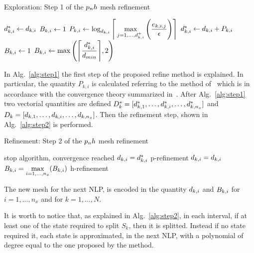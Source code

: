 


\begin{algorithm}
\caption{Exploration: Step 1 of the $p_{n}h$ mesh refinement}\label{alg:step1}
	\begin{algorithmic}[1]
				\State $d_{k,i}^{*} \gets d_{k,i}$
				\State $B_{k,i} \gets 1$  %
			\Else
				\State $P_{k,i} \gets \log_{d_{k,i}} \Bigg\lceil \max\limits_{j= 1, \dots, d_{k,i}^{+}} \Bigg(\dfrac{e_{k,i,j}}{\epsilon}\Bigg) \Bigg\rceil$
				\State $d_{k,i}^{*} \gets d_{k,i} + P_{k,i}$
						\State $B_{k,i} \gets 1$		
					\Else
						\State $B_{k,i} \gets \max\Bigg(\Bigg\lceil \dfrac{d_{k,i}^{*}}{d_{min}}\Bigg\rceil, 2\Bigg)$
					\EndIf
			\EndIf
		\EndFor
	\end{algorithmic}
\end{algorithm}

In Alg.~\ref{alg:step1} the first step of the proposed refine method is explained. In particular, the quantity $P_{k,i}$ is calculated referring to the method of~\cite{Patterson:OCAM:2015} which is in accordance with the convergence theory summarized in~\cite{Hou:GNC:2012,Hou:PHD:2013}.  After Alg.~\ref{alg:step1} two vectorial quantities are defined $D_{k}^{*} = [d_{k,1}^{*}, \dots, d_{k,i}^{*}, \dots, d_{k,n_x}^{*}]$ and $D_{k} = [d_{k,1}, \dots, d_{k,i}, \dots, d_{k,n_x}]$. Then the refinement step, shown in Alg.~\ref{alg:step2} is performed.

\begin{algorithm}
	\caption{Refinement: Step 2 of the $p_{n}h$ mesh refinement}\label{alg:step2}
	\begin{algorithmic}[1]
			\If {$\Dks = \Dk$}
				\State stop algorithm, convergence reached	
			\Else
					\State $d_{k,i} = d_{k,i}^{*}$ \Comment p-refinement
				\EndFor
			\EndIf
		\Else
				\State $d_{k,i} = d_{k,i}$
				\State $B_{k,i} = \max\limits_{i= 1, \dots, n_x}(B_{k,i})$ \Comment h-refinement
			\EndFor		
		\EndIf
	\end{algorithmic}
\end{algorithm}


The new mesh for the next NLP, is encoded in the quantity $d_{k,i}$ and $B_{k,i}$ for $i = 1, \dots, n_x$ and for $k = 1, \dots, N$.

It is worth to notice that, as explained in Alg.~\ref{alg:step2}, in each interval, if at least one of the state required to split $S_k$, then it is splitted. Instead if no state required it, each state is approximated, in the next NLP, with a polynomial of degree equal to the one proposed by the method.

